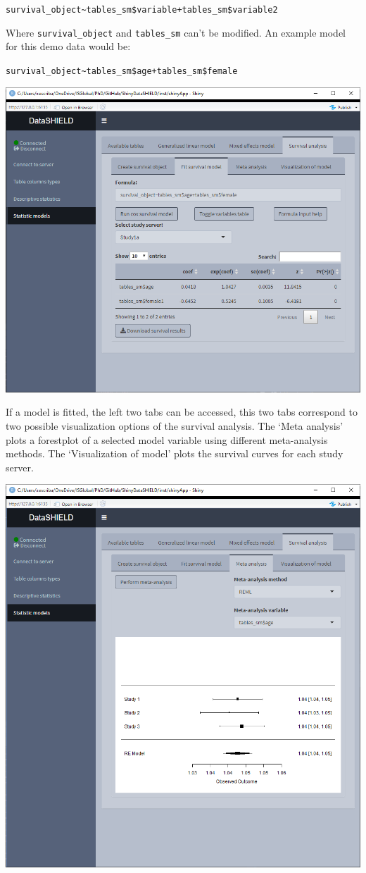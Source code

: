 \documentclass[
]{book}
\begin{document}
\texttt{survival\_object\textasciitilde{}tables\_sm\$variable+tables\_sm\$variable2}

Where \texttt{survival\_object} and \texttt{tables\_sm} can't be modified. An example model for this demo data would be:

\texttt{survival\_object\textasciitilde{}tables\_sm\$age+tables\_sm\$female}

\includegraphics{images/survival4.png}

If a model is fitted, the left two tabs can be accessed, this two tabs correspond to two possible visualization options of the survival analysis. The `Meta analysis' plots a forestplot of a selected model variable using different meta-analysis methods. The `Visualization of model' plots the survival curves for each study server.

\includegraphics{images/survival5.png}
\end{document}
